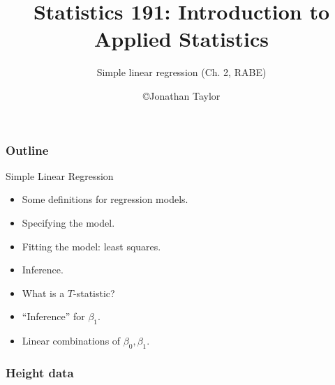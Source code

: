 \documentclass[handout]{beamer}
\title{Statistics 191: Introduction to Applied Statistics}
\subtitle{Simple linear regression (Ch. 2, RABE)}
\author{\copyright Jonathan Taylor \\
   }
\begin{document}
   \begin{frame}
   \titlepage
   \end{frame}


   \begin{frame} \frametitle{Outline}

   \begin{block}
   {Simple Linear Regression}
   \begin{itemize}
   \item Some definitions for regression models.
   \item Specifying the model.
   \item Fitting the model: least squares.
   \item Inference.

   \item What is a $T$-statistic?

   \item ``Inference'' for $\beta_1$.

   \item Linear combinations of $\beta_0, \beta_1$.

   \end{itemize}
   \end{block}
   \vfill
   \end{frame}



   \begin{frame}
   \frametitle{Height data}
   \begin{center}
   \end{center}

   \end{frame}
\end{document}

